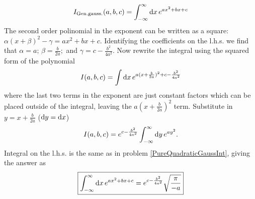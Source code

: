 \begin{problem}
\begin{equation}
	I_{\text{Gen.gauss.}}(a, b, c) = \int_{-\infty}^{\infty} {\rm{d}}x\, e^{ax^2 + bx + c}
\end{equation}
The second order polinomial in the exponent can be written as a square: $ \alpha(x + \beta)^2 - \gamma = ax^2 + bx + c$. Identifying the coefficients on the l.h.s. we find that $\alpha = a;\, \beta = \frac{b}{2a};$ and $\gamma = c - \frac{b^2}{4a^2}$. Now rewrite the integral using the squared form of the polynomial
\begin{equation}
	I(a, b, c) = \int {\rm{d}}x\, e^{a(x + \frac{b}{2a})^2 + c - \frac{b^2}{4a^2}}
\end{equation}
where the last two terms in the exponent are just constant factors which can be placed outside of the integral, leaving the $a(x + \frac{b}{2a})^2$ term. Substitute in $y = x + \frac{b}{2a}$ (${\rm{d}}y = {\rm{d}}x$)
\begin{equation}
	I(a, b, c) = e^{c - \frac{b^2}{4a^2}} \int_{-\infty}^{\infty} {\rm{d}}y\, e^{ay^2}.
\end{equation}
Integral on the l.h.s. is the same as in problem \ref{PureQuadraticGaussInt}, giving the answer as
\begin{equation}
	\boxed{\int_{-\infty}^{\infty} {\rm{d}}x\, e^{ax^2 + bx + c} = e^{c - \frac{b^2}{4a^2}} \sqrt{\frac{\pi}{-a}}}
\end{equation}
\end{problem}






